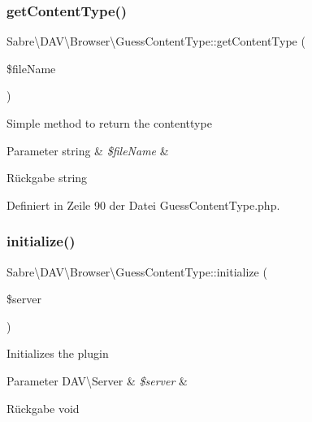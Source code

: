 \subsubsection{\texorpdfstring{get\+Content\+Type()}{getContentType()}}
{\footnotesize\ttfamily Sabre\textbackslash{}\+D\+A\+V\textbackslash{}\+Browser\textbackslash{}\+Guess\+Content\+Type\+::get\+Content\+Type (\begin{DoxyParamCaption}\item[{}]{\$file\+Name }\end{DoxyParamCaption})\hspace{0.3cm}{\ttfamily [protected]}}

Simple method to return the contenttype


\begin{DoxyParams}[1]{Parameter}
string & {\em \$file\+Name} & \\
\hline
\end{DoxyParams}
\begin{DoxyReturn}{Rückgabe}
string 
\end{DoxyReturn}


Definiert in Zeile 90 der Datei Guess\+Content\+Type.\+php.

\mbox{\label{class_sabre_1_1_d_a_v_1_1_browser_1_1_guess_content_type_a9e2afe74ab53f8a8ce4e4436b73cf345}} 
\subsubsection{\texorpdfstring{initialize()}{initialize()}}
{\footnotesize\ttfamily Sabre\textbackslash{}\+D\+A\+V\textbackslash{}\+Browser\textbackslash{}\+Guess\+Content\+Type\+::initialize (\begin{DoxyParamCaption}\item[{\mbox{\hyperlink{class_sabre_1_1_d_a_v_1_1_server}{D\+A\+V\textbackslash{}\+Server}}}]{\$server }\end{DoxyParamCaption})}

Initializes the plugin


\begin{DoxyParams}[1]{Parameter}
D\+A\+V\textbackslash{}\+Server & {\em \$server} & \\
\hline
\end{DoxyParams}
\begin{DoxyReturn}{Rückgabe}
void 
\end{DoxyReturn}


